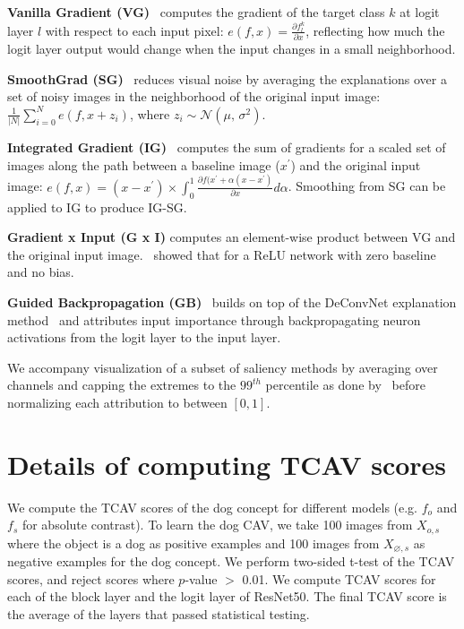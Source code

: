 \begin{appendix}
\textbf{Vanilla Gradient (VG)}~\cite{Simonyan13,Erhan09,Baehrens10} computes the gradient of the target class $k$ at logit layer $l$ with respect to each input pixel: $e(f,x)=\frac{\partial f_l^k}{\partial x}$, reflecting how much the logit layer output would change when the input changes in a small neighborhood.

\textbf{SmoothGrad (SG)}~\cite{Smilkov17} reduces visual noise by averaging the explanations over a set of noisy images in the neighborhood of the original input image: $\frac{1}{|N|}\sum_{i=0}^N{e(f, x+z_i)}$, where $z_i \sim \mathcal{N}(\mu,\,\sigma^{2})$.

\textbf{Integrated Gradient (IG)}~\cite{Sundararajan17} computes the sum of gradients for a scaled set of images along the path between a baseline image ($x^\prime$) and the original input image: $e(f,x) = (x-x^\prime) \times \int_{0}^{1} \frac{\partial f(x^\prime + \alpha (x - x^\prime)}{\partial x}d\alpha$. Smoothing from SG can be applied to IG to produce IG-SG.

\textbf{Gradient x Input (G x I)} computes an element-wise product between VG and the original input image.~\cite{Ancona18} showed that for a ReLU network with zero baseline and no bias.

\textbf{Guided Backpropagation (GB)}~\cite{Springenberg14} builds on top of the DeConvNet explanation method~\cite{zeiler2014visualizing} and attributes input importance through backpropagating neuron activations from the logit layer to the input layer.

We accompany visualization of a subset of saliency methods by averaging over channels and capping the extremes to the $99^{th}$ percentile as done by~\cite{Sundararajan17,Smilkov17} before normalizing each attribution to between $[0,1]$. 

\section{Details of computing TCAV scores}
We compute the TCAV scores of the dog concept for different models (e.g. $f_o$ and $f_s$ for absolute contrast). To learn the dog CAV, we take 100 images from $X_{o,s}$ where the object is a dog as positive examples and 100 images from $X_{\varnothing,s}$ as negative examples for the dog concept. We perform two-sided t-test of the TCAV scores, and reject scores where $p$-value $>$ 0.01. We compute TCAV scores for each of the block layer and the logit layer of ResNet50. The final TCAV score is the average of the layers that passed statistical testing.


\end{appendix}
